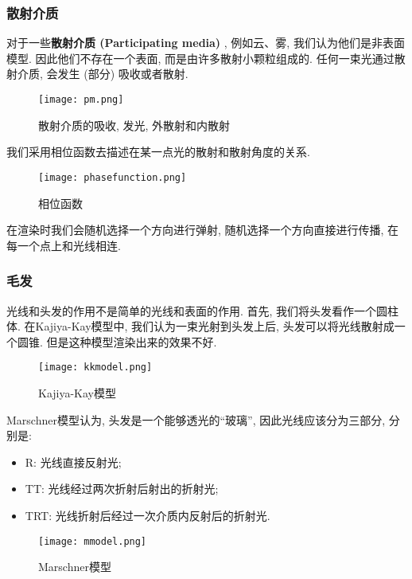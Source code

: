 \subsubsection{散射介质}

对于一些\textbf{散射介质 (Participating media) }, 例如云、雾, 我们认为他们是非表面模型. 因此他们不存在一个表面, 而是由许多散射小颗粒组成的. 任何一束光通过散射介质, 会发生 (部分) 吸收或者散射. 

\begin{figure}[H]
	\centering
	\texttt{[image: pm.png]}
	\caption{散射介质的吸收, 发光, 外散射和内散射}
	\label{fig:pm}
\end{figure}

我们采用相位函数去描述在某一点光的散射和散射角度的关系. 

\begin{figure}[H]
	\centering
	\texttt{[image: phasefunction.png]}
	\caption{相位函数}
	\label{fig:pf}
\end{figure}

在渲染时我们会随机选择一个方向进行弹射, 随机选择一个方向直接进行传播, 在每一个点上和光线相连. 

\subsubsection{毛发}

光线和头发的作用不是简单的光线和表面的作用. 首先, 我们将头发看作一个圆柱体. 在Kajiya-Kay模型中, 我们认为一束光射到头发上后, 头发可以将光线散射成一个圆锥. 但是这种模型渲染出来的效果不好. 

\begin{figure}[H]
	\centering
	\texttt{[image: kkmodel.png]}
	\caption{Kajiya-Kay模型}
	\label{fig:kk}
\end{figure}

Marschner模型认为, 头发是一个能够透光的``玻璃”, 因此光线应该分为三部分, 分别是: 
\begin{itemize}
	\item R: 光线直接反射光; 
	\item TT: 光线经过两次折射后射出的折射光; 
	\item TRT: 光线折射后经过一次介质内反射后的折射光. 
\end{itemize}

\begin{figure}[H]
	\centering
	\texttt{[image: mmodel.png]}
	\caption{Marschner模型}
	\label{fig:mm}
\end{figure}

